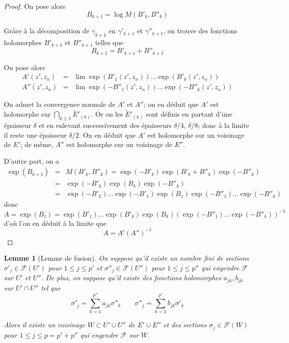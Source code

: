 \documentclass{article}
\newtheorem{lemme}[theoreme]{Lemme}
\theoremstyle{definition}
\theoremstyle{remarque}
\begin{document}
\begin{proof}
On pose alors $$B_{k+1}=\log M(B'_k, B''_k)$$

Grâce à la décomposition de $\gamma_{k+1}$ en $\gamma'_{k+1}$ et $\gamma''_{k+1}$, on trouve des fonctions holomorphes $B'_{k+1}$ et $B''_{k+1}$ telles que $$B_{k+1} = B'_{k+1} + B''_{k+1}$$

On pose alors
\begin{eqnarray}
\nonumber A'(z', z_n) &=& \lim \exp(B'_1(z',z_n))...\exp(B'_k(z', z_n)) \\
\nonumber A''(z', z_n) &=& \lim \exp(-B''_1(z',z_n))...\exp(-B''_k(z', z_n))
\end{eqnarray}

On admet la convergence normale de $A'$ et $A''$; on en déduit que $A'$ est holomorphe sur $\bigcap_{k \geq 1} \tilde{E}'_{(k)}$. Or on les $\tilde{E}'_{(k)}$ sont définis en partant d'une épaisseur $\delta$ et en enlevant successivement des épaisseurs $\delta/4$, $\delta/8$; donc à la limite il reste une épaisseur $\delta/2$. On en déduit que $A'$ est holomorphe sur un voisinage de $E'$; de même, $A''$ est holomorphe sur un voisinage de $E''$.

D'autre part, on a
\begin{eqnarray}
\nonumber \exp(B_{k+1}) &=& M(B'_k,B''_k) = \exp(-B'_k)\exp(B'_k+B''_k)\exp(-B''_k) \\
\nonumber &=& \exp(-B'_k)\exp(B_k)\exp(-B''_k) \\
\nonumber &=& \exp(-B'_k)...\exp(-B'_1)\exp(B_1)\exp(-B''_1)...\exp(-B''_k)
\end{eqnarray}
donc $$A = \exp(B_1) = \exp(B'_1)...\exp(B'_k)\exp(B_k)(\exp(-B''_1)...\exp(-B''_k))^{-1}$$
d'où l'on en déduit à la limite que $$A = A' (A'')^{-1}$$
\end{proof}

\begin{lemme}[Lemme de fusion]
On suppose qu'il existe un nombre fini de sections $\sigma'_j \in \mathcal{F}(U')$ pour $1\leq j \leq p'$ et $\sigma''_j \in \mathcal{F}(U'')$ pour $1\leq j \leq p''$ qui engendre $\mathcal{F}$ sur $U'$ et $U''$. De plus, on suppose qu'il existe des fonctions holomorphes $a_{jk}, b_{jk}$ sur $U' \cap U''$ tel que
\begin{equation*}
\sigma'_j = \sum_{k=1}^{p''} a_{jk}\sigma''_k \qquad
\sigma''_j = \sum_{k=1}^{p'} b_{jk}\sigma'_k
\end{equation*}

Alors il existe un voisinage $W \subset U' \cup U''$ de $E' \cup E''$ et des sections $\sigma_j \in \mathcal{F}(W)$ pour $1\leq j \leq p=p'+p''$ qui engendre $\mathcal{F}$ sur $W$.
\end{lemme}
\end{document}
